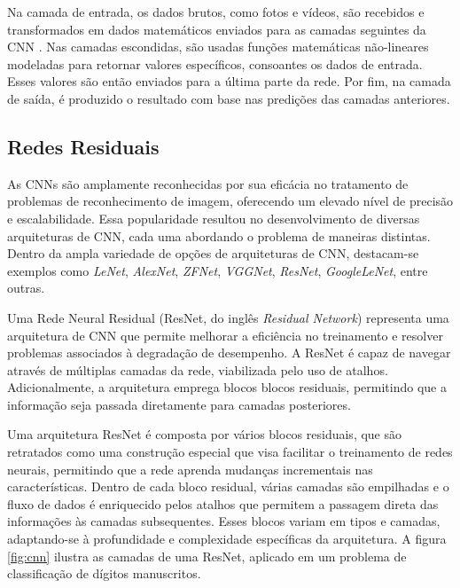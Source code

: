 Na camada de entrada, os dados brutos, como fotos e vídeos, são recebidos e transformados em dados matemáticos enviados para as camadas seguintes da CNN \cite{cnn}. Nas camadas escondidas, são usadas funções matemáticas não-lineares modeladas para retornar valores específicos, consoantes os dados de entrada. Esses valores são então enviados para a última parte da rede. Por fim, na camada de saída, é produzido o resultado com base nas predições das camadas anteriores.


\subsection{\esp Redes Residuais} \label{redesresiduais}

As CNNs são amplamente reconhecidas por sua eficácia no tratamento de problemas de reconhecimento de imagem, oferecendo um elevado nível de precisão e escalabilidade. Essa popularidade resultou no desenvolvimento de diversas arquiteturas de CNN, cada uma abordando o problema de maneiras distintas. Dentro da ampla variedade de opções de arquiteturas de CNN, destacam-se exemplos como \textit{LeNet}, \textit{AlexNet}, \textit{ZFNet}, \textit{VGGNet}, \textit{ResNet}, \textit{GoogleLeNet}, entre outras. 

Uma Rede Neural Residual (ResNet, do inglês \textit{Residual Network}) representa uma arquitetura de CNN que permite melhorar a eficiência no treinamento e resolver problemas associados à degradação de desempenho. A ResNet é capaz de navegar através de múltiplas camadas da rede, viabilizada pelo uso de atalhos. Adicionalmente, a arquitetura emprega blocos blocos residuais, permitindo que a informação seja passada diretamente para camadas posteriores. 

Uma arquitetura ResNet é composta por vários blocos residuais, que são retratados como uma construção especial que visa facilitar o treinamento de redes neurais, permitindo que a rede aprenda mudanças incrementais nas características. Dentro de cada bloco residual, várias camadas são empilhadas e o fluxo de dados é enriquecido pelos atalhos que permitem a passagem direta das informações às camadas subsequentes. Esses blocos variam em tipos e camadas, adaptando-se à profundidade e complexidade específicas da arquitetura. A figura \ref{fig:cnn} ilustra as camadas de uma ResNet, aplicado em um problema de classificação de dígitos manuscritos.

